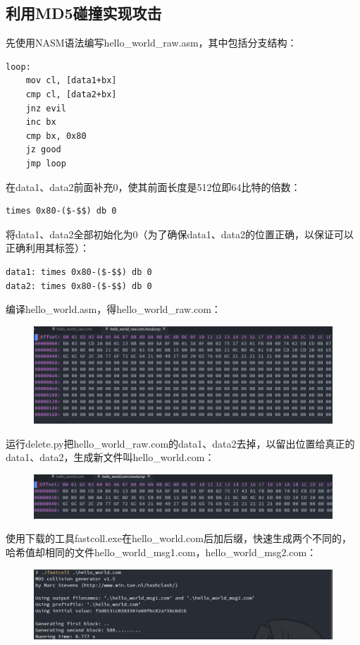 \documentclass[UTF8, a4paper, 11pt]{article}
\begin{document}
\subsection{利用MD5碰撞实现攻击}
先使用NASM语法编写hello\_world\_raw.asm，其中包括分支结构：
\begin{lstlisting}
loop:
    mov cl, [data1+bx]
    cmp cl, [data2+bx]
    jnz evil
    inc bx
    cmp bx, 0x80
    jz good
    jmp loop
\end{lstlisting}
在data1、data2前面补充0，使其前面长度是512位即64比特的倍数：
\begin{lstlisting}
times 0x80-($-$$) db 0
\end{lstlisting}
将data1、data2全部初始化为0（为了确保data1、data2的位置正确，以保证可以正确利用其标签）：
\begin{lstlisting}
data1: times 0x80-($-$$) db 0
data2: times 0x80-($-$$) db 0
\end{lstlisting}
编译hello\_world.asm，得hello\_world\_raw.com：
\begin{figure}[H]
    \centering
    \includegraphics[width = \textwidth]{raw.png}
\end{figure}
运行delete.py把hello\_world\_raw.com的data1、data2去掉，以留出位置给真正的data1、data2，生成新文件叫hello\_world.com：
\begin{figure}[H]
    \centering
    \includegraphics[width = \textwidth]{hello.png}
\end{figure}
使用下载的工具fastcoll.exe在hello\_world.com后加后缀，快速生成两个不同的，哈希值却相同的文件hello\_world\_msg1.com，hello\_world\_msg2.com：
\begin{figure}[H]
    \centering
    \includegraphics[width = \textwidth]{fastcoll.png}
\end{figure}
\end{document}
